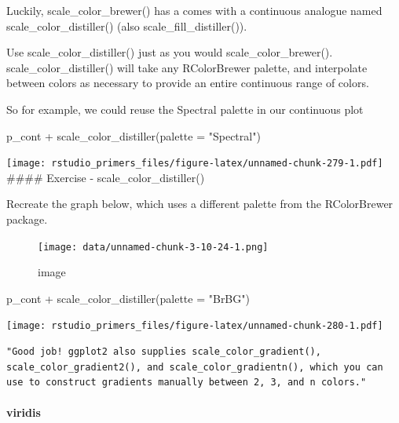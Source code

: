 \documentclass[
]{article}
\newenvironment{Shaded}{\begin{snugshade}}{\end{snugshade}}
\newcommand{\AttributeTok}[1]{\textcolor[rgb]{0.77,0.63,0.00}{#1}}
\newcommand{\FunctionTok}[1]{\textcolor[rgb]{0.00,0.00,0.00}{#1}}
\newcommand{\NormalTok}[1]{#1}
\newcommand{\SpecialCharTok}[1]{\textcolor[rgb]{0.00,0.00,0.00}{#1}}
\newcommand{\StringTok}[1]{\textcolor[rgb]{0.31,0.60,0.02}{#1}}
\begin{document}
Luckily, scale\_color\_brewer() has a comes with a continuous analogue
named scale\_color\_distiller() (also scale\_fill\_distiller()).

Use scale\_color\_distiller() just as you would scale\_color\_brewer().
scale\_color\_distiller() will take any RColorBrewer palette, and
interpolate between colors as necessary to provide an entire continuous
range of colors.

So for example, we could reuse the Spectral palette in our continuous
plot

\begin{Shaded}
\begin{Highlighting}[]
\NormalTok{p\_cont }\SpecialCharTok{+} \FunctionTok{scale\_color\_distiller}\NormalTok{(}\AttributeTok{palette =} \StringTok{"Spectral"}\NormalTok{)}
\end{Highlighting}
\end{Shaded}

\texttt{[image: rstudio\_primers\_files/figure-latex/unnamed-chunk-279-1.pdf]}
\#\#\#\# Exercise - scale\_color\_distiller()

Recreate the graph below, which uses a different palette from the
RColorBrewer package.

\begin{figure}
\centering
\texttt{[image: data/unnamed-chunk-3-10-24-1.png]}
\caption{image}
\end{figure}

\begin{Shaded}
\begin{Highlighting}[]
\NormalTok{p\_cont }\SpecialCharTok{+} \FunctionTok{scale\_color\_distiller}\NormalTok{(}\AttributeTok{palette =} \StringTok{"BrBG"}\NormalTok{)}
\end{Highlighting}
\end{Shaded}

\texttt{[image: rstudio\_primers\_files/figure-latex/unnamed-chunk-280-1.pdf]}

\begin{verbatim}
"Good job! ggplot2 also supplies scale_color_gradient(), scale_color_gradient2(), and scale_color_gradientn(), which you can use to construct gradients manually between 2, 3, and n colors."
\end{verbatim}

\hypertarget{viridis}{%
\paragraph{viridis}\label{viridis}}
\end{document}
